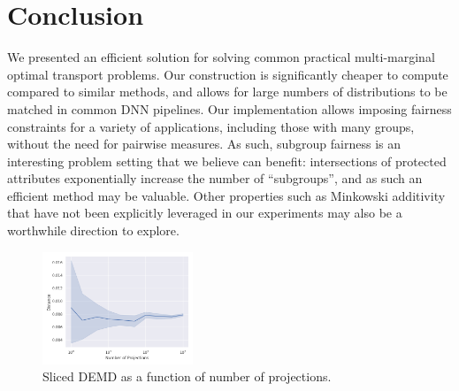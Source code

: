 \section{Conclusion}
We presented an efficient solution for solving common practical multi-marginal optimal transport problems.
Our construction is significantly cheaper to compute compared to similar methods,
and allows for large numbers of distributions to be matched in common DNN pipelines. 
Our implementation allows imposing fairness constraints for a variety of applications, including those with many groups, without the need for pairwise measures.
As such, subgroup fairness \citep{kearns2018preventing} is an interesting problem setting that we believe can benefit:
intersections of protected attributes exponentially increase the number of ``subgroups'',
and as such an efficient method may be valuable.
Other properties such as 
Minkowski additivity that have not been 
explicitly leveraged in our experiments may also be a worthwhile direction to explore.
\begin{figure}
    \centering
    \includegraphics[width=0.4\textwidth]{6_demd/figs/sliced/demd_multidim_proj_convergence_CelebA.png}
    \caption{Sliced DEMD as a function of number of projections.}
    \label{fig:sliced}
\end{figure}


